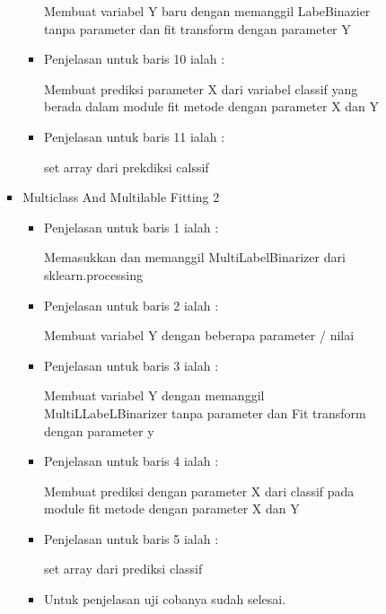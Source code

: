 \begin{enumerate}
\begin{itemize}
\begin{enumerate}
\begin{itemize}
\begin{itemize}
\par Membuat variabel Y baru dengan memanggil LabeBinazier tanpa parameter dan fit transform dengan parameter Y
\par
\item Penjelasan untuk baris 10 ialah :
\par Membuat prediksi parameter X dari variabel classif yang berada dalam module fit metode dengan parameter X dan Y
\par
\item Penjelasan untuk baris 11 ialah :
\par set array dari prekdiksi calssif
\par
\end{itemize}
\end{itemize}
\par
\par
\begin{itemize}
\item Multiclass And Multilable Fitting 2 
\par
\begin{itemize}
\item Penjelasan untuk baris 1 ialah : 
\par Memasukkan dan memanggil MultiLabelBinarizer dari sklearn.processing
\par
\par
\item Penjelasan untuk baris 2 ialah :
\par Membuat variabel Y dengan beberapa parameter / nilai
\par
\item Penjelasan untuk baris 3  ialah :
\par Membuat variabel Y dengan memanggil MultiLLabeLBinarizer tanpa parameter dan Fit transform dengan parameter y
\par
\item Penjelasan untuk baris 4  ialah :
\par Membuat prediksi dengan parameter X dari classif pada module fit metode dengan parameter X dan Y
\par
\item Penjelasan untuk baris 5  ialah :
\par set array dari prediksi classif
\par
\item Untuk penjelasan uji cobanya sudah selesai.
\par
\end{itemize}
\end{itemize}
\end{enumerate}
\end{itemize}
\end{enumerate}




